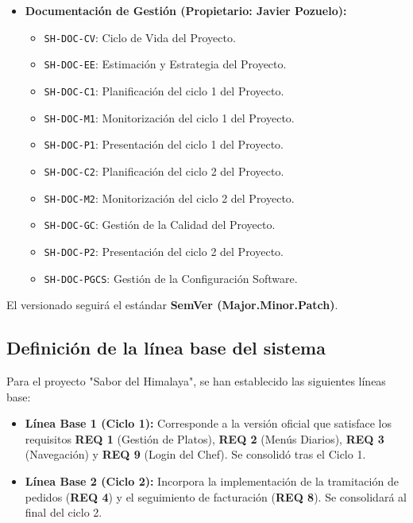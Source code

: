 \documentclass[11pt,a4paper]{article}
\begin{document}
\begin{itemize}
    \item \textbf{Documentación de Gestión (Propietario: Javier Pozuelo):}
        \begin{itemize}
            \item \texttt{SH-DOC-CV}: Ciclo de Vida del Proyecto.
            \item \texttt{SH-DOC-EE}: Estimación y Estrategia del Proyecto.
            \item \texttt{SH-DOC-C1}: Planificación del ciclo 1 del Proyecto.
            \item \texttt{SH-DOC-M1}: Monitorización del ciclo 1 del Proyecto.
            \item \texttt{SH-DOC-P1}: Presentación del ciclo 1 del Proyecto.
            \item \texttt{SH-DOC-C2}: Planificación del ciclo 2 del Proyecto.
            \item \texttt{SH-DOC-M2}: Monitorización del ciclo 2 del Proyecto.
            \item \texttt{SH-DOC-GC}: Gestión de la Calidad del Proyecto.
            \item \texttt{SH-DOC-P2}: Presentación del ciclo 2 del Proyecto.
            \item \texttt{SH-DOC-PGCS}: Gestión de la Configuración Software.
        \end{itemize}
\end{itemize}

El versionado seguirá el estándar \textbf{SemVer (Major.Minor.Patch)}.

\subsection{Definición de la línea base del sistema}

Para el proyecto "Sabor del Himalaya", se han establecido las siguientes líneas base:

\begin{itemize}
    \item \textbf{Línea Base 1 (Ciclo 1):} Corresponde a la versión oficial que satisface los requisitos \textbf{REQ 1} (Gestión de Platos), \textbf{REQ 2} (Menús Diarios), \textbf{REQ 3} (Navegación) y \textbf{REQ 9} (Login del Chef). Se consolidó tras el Ciclo 1.

    \item \textbf{Línea Base 2 (Ciclo 2):} Incorpora la implementación de la tramitación de pedidos (\textbf{REQ 4}) y el seguimiento de facturación (\textbf{REQ 8}). Se consolidará al final del ciclo 2.
\end{itemize}
\end{document}
